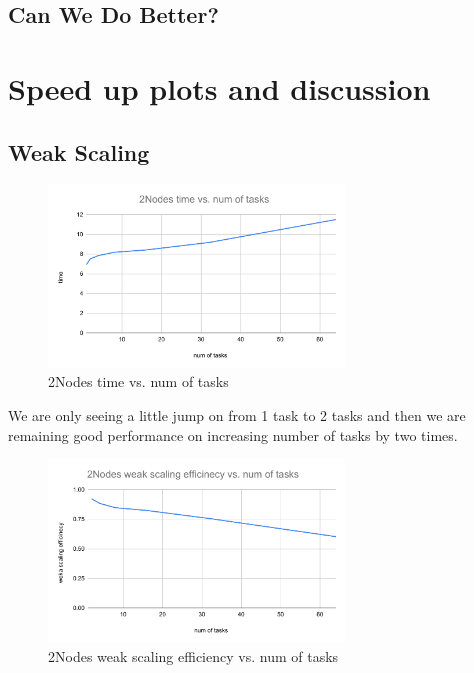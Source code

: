 \documentclass{article}
\begin{document}
\subsection{Can We Do Better?}

\section{Speed up plots and discussion}
\subsection{Weak Scaling}
\begin{figure}[H] %
\centering %
\includegraphics[width=0.7\textwidth]{2Nodes time vs. num of tasks.pdf} %
\caption{2Nodes time vs. num of tasks} %
\label{2Nodes time vs. num of tasks} %
\end{figure}

We are only seeing a little jump on from 1 task to 2 tasks and then we are remaining good performance on increasing number of tasks by two times.


\begin{figure}[H] %
\centering %
\includegraphics[width=0.7\textwidth]{2Nodes weak scaling efficinecy vs. num of tasks.pdf} %
\caption{2Nodes weak scaling efficiency vs. num of tasks} %
\label{2Nodes weak scaling efficinecy vs. num of tasks} %
\end{figure}
\end{document}
